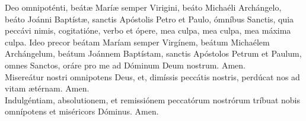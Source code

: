  Deo omnipoténti, beát{\ae} Marí{\ae} semper Virigini, beáto Michaéli Archángelo, beáto Joánni Baptíst{\ae}, sanctis 
Apóstolis Petro et Paulo, ómníbus Sanctis, quia peccávi nimis, cogitatióne, verbo et ópere, mea culpa, mea culpa, mea máxima culpa. Ideo precor beátam
Maríam semper Virgínem, beátum Michaélem Archángelum, beátum Joánnem Baptístam, sanctis Apóstolos Petrum et Paulum, omnes Sanctos,
oráre pro me ad Dóminum Deum nostrum. Amen.\\
Misereátur nostri omnipotens Deus, et, dimíssis peccátis nostris, perdúcat nos ad vitam {\ae}térnam. Amen.\\
Indulgéntiam, absolutionem, et remissiónem peccatórum nostrórum tríbuat nobis omnípotens et miséricors Dóminus. Amen.